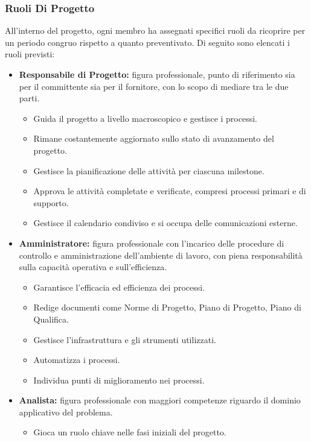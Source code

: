\documentclass{article}
\begin{document}
\subsubsection{Ruoli Di Progetto}
All'interno del progetto, ogni membro ha assegnati specifici ruoli da ricoprire per un periodo congruo rispetto a quanto preventivato. Di seguito sono elencati i ruoli previsti:
\begin{itemize}
    \item \textbf{Responsabile di Progetto:} figura professionale, punto di riferimento sia per il committente sia per il fornitore, con lo scopo di mediare tra le due parti.
        \begin{itemize}
            \item Guida il progetto a livello macroscopico e gestisce i processi.
            \item Rimane costantemente aggiornato sullo stato di avanzamento del progetto.
            \item Gestisce la pianificazione delle attività per ciascuna milestone.
            \item Approva le attività completate e verificate, compresi processi primari e di supporto.
            \item Gestisce il calendario condiviso e si occupa delle comunicazioni esterne.
        \end{itemize}
    \item \textbf{Amministratore:} figura professionale con l’incarico delle procedure di controllo e amministrazione dell’ambiente di lavoro, con piena responsabilità sulla capacità operativa e sull’efficienza.
        \begin{itemize}
            \item Garantisce l'efficacia ed efficienza dei processi.
            \item Redige documenti come Norme di Progetto, Piano di Progetto, Piano di Qualifica.
            \item Gestisce l'infrastruttura e gli strumenti utilizzati.
            \item Automatizza i processi.
            \item Individua punti di miglioramento nei processi.
        \end{itemize}
    \item \textbf{Analista:} figura professionale con maggiori competenze riguardo il dominio applicativo del problema.
        \begin{itemize}
            \item Gioca un ruolo chiave nelle fasi iniziali del progetto.

\end{itemize}
\end{itemize}
\end{document}
